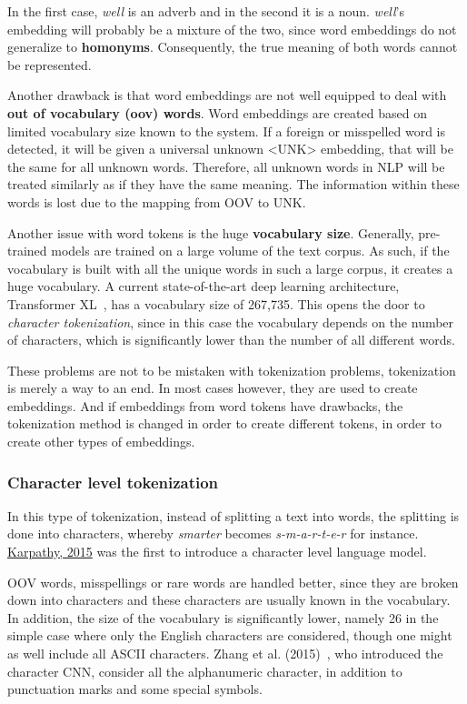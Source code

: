 In the first case, \textit{well} is an adverb and in the second it is a noun. \emph{well}'s embedding will probably be a mixture of the two, since word embeddings do not generalize to \textbf{homonyms}. Consequently, the true meaning of both words cannot be represented.

Another drawback is that word embeddings are not well equipped to deal with \textbf{out of vocabulary (oov) words}. Word embeddings are created based on limited vocabulary size known to the system. If a foreign or misspelled word is detected, it will be given a universal unknown <UNK> embedding, that will be the same for all unknown words. Therefore, all unknown words in NLP will be treated similarly as if they have the same meaning. The information within these words is lost due to the mapping from OOV to UNK.

Another issue with word tokens is the huge \textbf{vocabulary size}. Generally, pre-trained models are trained on a large volume of the text corpus. As such, if the vocabulary is built with all the unique words in such a large corpus, it creates a huge vocabulary. A current state-of-the-art deep learning architecture, Transformer XL~\cite{dai2019transformerxl}, has a vocabulary size of 267,735. This opens the door to \emph{character tokenization}, since in this case the vocabulary depends on the number of characters, which is significantly lower than the number of all different words.

These problems are not to be mistaken with tokenization problems, tokenization is merely a way to an end. In most cases however, they are used to create embeddings. And if embeddings from word tokens have drawbacks, the tokenization method is changed in order to create different tokens, in order to create other types of embeddings.
    
\subsubsection{Character level tokenization}

In this type of tokenization, instead of splitting a text into words, the splitting is done into characters, whereby \emph{smarter} becomes \emph{s-m-a-r-t-e-r} for instance. \href{https://github.com/karpathy/char-rnn}{Karpathy, 2015} was the first to introduce a character level language model.

OOV words, misspellings or rare words are handled better, since they are broken down into characters and these characters are usually known in the vocabulary. In addition, the size of the vocabulary is significantly lower, namely 26 in the simple case where only the English characters are considered, though one might as well include all ASCII characters. Zhang et al. (2015)~\cite{zhang2015text}, who introduced the character CNN, consider all the alphanumeric character, in addition to punctuation marks and some special symbols.

